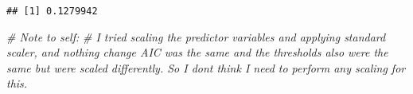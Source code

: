 \documentclass[
]{article}
\newenvironment{Shaded}{\begin{snugshade}}{\end{snugshade}}
\newcommand{\AttributeTok}[1]{\textcolor[rgb]{0.13,0.29,0.53}{#1}}
\newcommand{\CommentTok}[1]{\textcolor[rgb]{0.56,0.35,0.01}{\textit{#1}}}
\newcommand{\DecValTok}[1]{\textcolor[rgb]{0.00,0.00,0.81}{#1}}
\newcommand{\FunctionTok}[1]{\textcolor[rgb]{0.13,0.29,0.53}{\textbf{#1}}}
\newcommand{\NormalTok}[1]{#1}
\newcommand{\OtherTok}[1]{\textcolor[rgb]{0.56,0.35,0.01}{#1}}
\newcommand{\SpecialCharTok}[1]{\textcolor[rgb]{0.81,0.36,0.00}{\textbf{#1}}}
\newcommand{\StringTok}[1]{\textcolor[rgb]{0.31,0.60,0.02}{#1}}
\begin{document}
\begin{Shaded}
\end{Shaded}

\begin{verbatim}
## [1] 0.1279942
\end{verbatim}

\begin{Shaded}
\begin{Highlighting}[]
\CommentTok{\# Note to self:}
\CommentTok{\# I tried scaling the predictor variables and applying standard scaler, and nothing change AIC was the same and the thresholds also were the same but were scaled differently. So I don\textquotesingle{}t think I need to perform any scaling for this.}
\end{Highlighting}
\end{Shaded}
\end{document}
